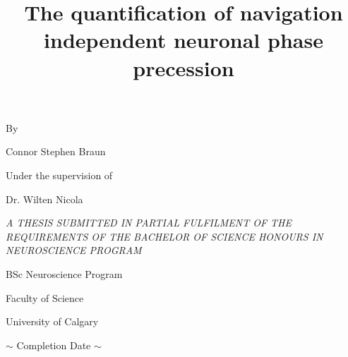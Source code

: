 \documentclass[12pt, letterpaper]{article}
\title{The quantification of navigation independent neuronal phase precession}
\date{}
\newenvironment{collapsable}{}{}
\begin{document}
\begin{collapsable}
    \maketitle
    \fontsize{12}{12}\selectfont
    \begin{large}
        \centerline{By}\vspace{12pt}
        \centerline{Connor Stephen Braun}\vspace{24pt}
        \centerline{Under the supervision of}\vspace{12pt}
        \centerline{Dr. Wilten Nicola}\vspace{72pt}
        {\centering\it
        A THESIS SUBMITTED IN PARTIAL FULFILMENT OF THE REQUIREMENTS OF THE BACHELOR 
        OF SCIENCE HONOURS IN NEUROSCIENCE PROGRAM\\}

        \vspace{36pt}
        \centerline{BSc Neuroscience Program}
        \centerline{Faculty of Science}
        \centerline{University of Calgary}\vspace{36pt}
        \centerline{$\sim$ Completion Date $\sim$}
    \end{large}
\end{collapsable}
\newpage

\begin{collapsable}
        
\end{collapsable}
\end{document}
